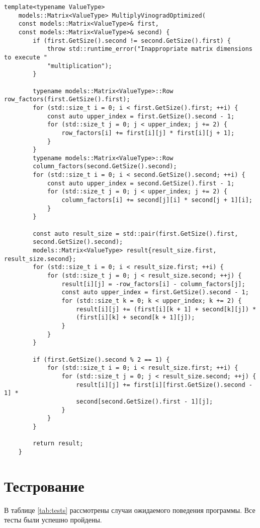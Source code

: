 \begin{lstlisting}[caption=Функция оптимизированного алгоритма Винограда умножения матриц]
	template<typename ValueType>
	models::Matrix<ValueType> MultiplyVinogradOptimized(
	const models::Matrix<ValueType>& first,
	const models::Matrix<ValueType>& second) {
		if (first.GetSize().second != second.GetSize().first) {
			throw std::runtime_error("Inappropriate matrix dimensions to execute "
			"multiplication");
		}
		
		typename models::Matrix<ValueType>::Row row_factors(first.GetSize().first);
		for (std::size_t i = 0; i < first.GetSize().first; ++i) {
			const auto upper_index = first.GetSize().second - 1;
			for (std::size_t j = 0; j < upper_index; j += 2) {
				row_factors[i] += first[i][j] * first[i][j + 1];
			}
		}
		typename models::Matrix<ValueType>::Row
		column_factors(second.GetSize().second);
		for (std::size_t i = 0; i < second.GetSize().second; ++i) {
			const auto upper_index = second.GetSize().first - 1;
			for (std::size_t j = 0; j < upper_index; j += 2) {
				column_factors[i] += second[j][i] * second[j + 1][i];
			}
		}
		
		const auto result_size = std::pair(first.GetSize().first,
		second.GetSize().second);
		models::Matrix<ValueType> result{result_size.first, result_size.second};
		for (std::size_t i = 0; i < result_size.first; ++i) {
			for (std::size_t j = 0; j < result_size.second; ++j) {
				result[i][j] = -row_factors[i] - column_factors[j];
				const auto upper_index = first.GetSize().second - 1;
				for (std::size_t k = 0; k < upper_index; k += 2) {
					result[i][j] += (first[i][k + 1] + second[k][j]) *
					(first[i][k] + second[k + 1][j]);
				}
			}
		}
		
		if (first.GetSize().second % 2 == 1) {
			for (std::size_t i = 0; i < result_size.first; ++i) {
				for (std::size_t j = 0; j < result_size.second; ++j) {
					result[i][j] += first[i][first.GetSize().second - 1] *
					second[second.GetSize().first - 1][j];
				}
			}
		}
		
		return result;
	}
\end{lstlisting}


\section{Тестрование}



В таблице \ref{tab:tests} рассмотрены случаи ожидаемого поведения программы. Все тесты были успешно пройдены.

